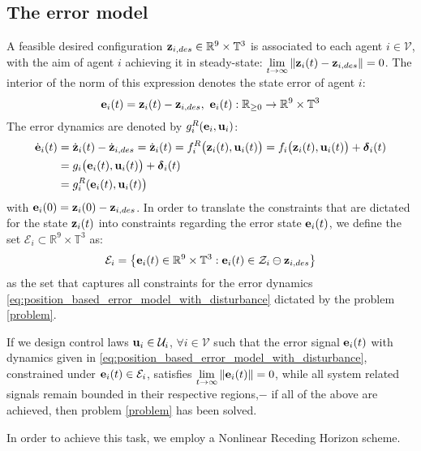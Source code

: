 \subsection{The error model}

A feasible desired configuration
$\bm{\mathbf{z}}_{i,des} \in \mathbb{R}^9 \times \mathbb{T}^3$
is associated to each agent $i \in \mathcal{V}$, with the aim of agent $i$
achieving it in steady-state:
$\lim\limits_{t \to \infty} \|\bm{\mathbf{z}}_i(t) - \bm{\mathbf{z}}_{i,des}\| = 0$. The
interior of the norm of this expression denotes the state error of agent $i$:
$$\bm{\mathbf{e}}_i(t) = \bm{\mathbf{z}}_i(t) - \bm{\mathbf{z}}_{i,des},\ \bm{\mathbf{e}}_i(t) :
\mathbb{R}_{\geq 0} \to \mathbb{R}^9 \times \mathbb{T}^3$$
The error dynamics are denoted by $g_i^R(\bm{\mathbf{e}}_i, \bm{\mathbf{u}}_i)$:
\begin{align}
  \dot{\bm{\mathbf{e}}}_i(t) &= \dot{\bm{\mathbf{z}}}_i(t) - \dot{\bm{\mathbf{z}}}_{i,des} =
  \dot{\bm{\mathbf{z}}}_i(t) = f_i^R\big(\bm{\mathbf{z}}_i(t), \bm{\mathbf{u}}_i(t)\big) =  f_i \big(\bm{\mathbf{z}}_i (t), \bm{\mathbf{u}}_i (t)\big) + \bm{\mathbf{\delta}}_i(t) \\
                      &=g_i \big(\bm{\mathbf{e}}_i (t), \bm{\mathbf{u}}_i (t)\big) + \bm{\mathbf{\delta}}_i(t) \\
                      &= g_i^R(\bm{\mathbf{e}}_i(t), \bm{\mathbf{u}}_i(t)\big)
    \label{eq:position_based_error_model_with_disturbance}
\end{align}
with $\bm{\mathbf{e}}_i(0) = \bm{\mathbf{z}}_i(0) - \bm{\mathbf{z}}_{i,des}$.
In order to translate
the constraints that are dictated for the state $\bm{\mathbf{z}}_i(t)$ into constraints
regarding the error state $\bm{\mathbf{e}}_i(t)$, we define the set
$\mathcal{E}_i \subset \mathbb{R}^9 \times \mathbb{T}^3$ as:
$$\mathcal{E}_i = \big\{\bm{\mathbf{e}}_i(t) \in \mathbb{R}^9 \times \mathbb{T}^3 :
\bm{\mathbf{e}}_i(t) \in \mathcal{Z}_i \ominus \bm{\mathbf{z}}_{i,des} \big\}$$
as the set that captures all constraints for the error dynamics
\eqref{eq:position_based_error_model_with_disturbance} dictated by the problem \eqref{problem}.

If we design control laws $\bm{\mathbf{u}}_i \in \mathcal{U}_i$,
$\forall i \in \mathcal{V}$ such that the error signal $\bm{\mathbf{e}}_i(t)$ with
dynamics given in \eqref{eq:position_based_error_model_with_disturbance}, constrained under
$\bm{\mathbf{e}}_i(t) \in \mathcal{E}_i$, satisfies
$\lim\limits_{t \to \infty} \|\bm{\mathbf{e}}_i(t)\| = 0$, while all system related
signals remain bounded in their respective regions,$-$ if all of the above are
achieved, then problem \eqref{problem} has been solved.

In order to achieve this task, we employ a Nonlinear Receding Horizon scheme.
